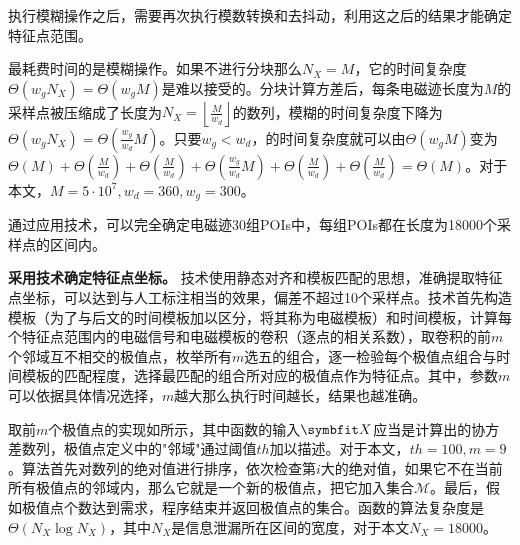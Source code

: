 {{	执行模糊操作之后，需要再次执行模数转换和去抖动，利用这之后的结果才能确定特征点范围。

	\poifanwei 最耗费时间的是模糊操作。如果不进行分块那么$N_X=M$，它的时间复杂度$\Theta(w_gN_X)=\Theta(w_gM)$是难以接受的。分块计算方差后，每条电磁迹长度为$M$的采样点被压缩成了长度为$N_X=\left\lfloor\frac{M}{w_d}\right\rfloor$的数列，模糊的时间复杂度下降为$\Theta(w_gN_X)=\Theta(\frac{w_g}{w_d}M)$。只要$w_g<w_d$，\poifanwei 的时间复杂度就可以由$\Theta\left( w_gM\right) $变为$\Theta(M)+\Theta\left( \frac{M}{w_d}\right) +\Theta\left( \frac{M}{w_d}\right) +\Theta\left( \frac{w_g}{w_d}M\right) +\Theta\left( \frac{M}{w_d}\right) +\Theta\left( \frac{M}{w_d}\right) =\Theta(M)$。对于本文，$M=5\cdot10^7,w_d=360,w_g=300$。
	
	通过应用\poifanwei 技术，可以完全确定电磁迹30组POIs中，每组POIs都在长度为18000个采样点的区间内。%
	
	
	\textbf{采用\yuchuli 技术确定特征点坐标。}
	\yuchuli 技术使用静态对齐和模板匹配的思想，准确提取特征点坐标，可以达到与人工标注相当的效果，偏差不超过10个采样点。\yuchuli 技术首先构造模板（为了与后文的时间模板加以区分，将其称为电磁模板）和时间模板，计算每个特征点范围内的电磁信号和电磁模板的卷积（逐点的相关系数），取卷积的前$m$个邻域互不相交的极值点，枚举所有$m$选五的组合，逐一检验每个极值点组合与时间模板的匹配程度，选择最匹配的组合所对应的极值点作为特征点。其中，参数$m$可以依据具体情况选择，$m$越大那么执行时间越长，结果也越准确。
	
	取前$m$个极值点的实现如所示，其中函数的输入$\Vector X$应当是计算出的协方差数列，极值点定义中的"邻域"通过阈值$th$加以描述。对于本文，$th=100,m=9$。算法首先对数列的绝对值进行排序，依次检查第$i$大的绝对值，如果它不在当前所有极值点的邻域内，那么它就是一个新的极值点，把它加入集合$\mathcal M$。最后，假如极值点个数达到需求，程序结束并返回极值点的集合。函数的算法复杂度是$\Theta(N_X\log N_X)$，其中$N_X$是信息泄漏所在区间的宽度，对于本文$N_X=18000$。
	
}}

